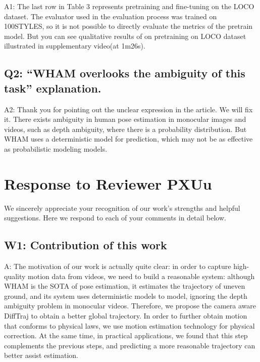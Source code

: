 \documentclass{article}
\begin{document}
A1: The last row in Table 3 represents pretraining and fine-tuning on the LOCO dataset. The evaluator used in the evaluation process was trained on 100STYLES, so it is not possible to directly evaluate the metrics of the pretrain model. But you can see qualitative results of on pretraining on LOCO dataset illustrated in supplementary video(at 1m26s).

\subsection{Q2: ``WHAM overlooks the ambiguity of this task'' explanation.}\label{q2-wham-overlooks-the-ambiguity-of-this-task-explanation.}

A2: Thank you for pointing out the unclear expression in the article. We will fix it. There exists ambiguity in human pose estimation in monocular images and videos, such as depth ambiguity, where there is a probability distribution. But WHAM uses a deterministic model for prediction, which may not be as effective as probabilistic modeling models.

\section{Response to Reviewer PXUu}\label{response-to-reviewer-pxuu}

We sincerely appreciate your recognition of our work's strengths and helpful suggestions. Here we respond to each of your comments in detail below.

\subsection{W1: Contribution of this work}\label{w1-contribution-of-this-work}

A: The motivation of our work is actually quite clear: in order to capture high-quality motion data from videos, we need to build a reasonable system: although WHAM is the SOTA of pose estimation, it estimates the trajectory of uneven ground, and its system uses deterministic models to model, ignoring the depth ambiguity problem in monocular videos. Therefore, we propose the camera aware DiffTraj to obtain a better global trajectory. In order to further obtain motion that conforms to physical laws, we use motion estimation technology for physical correction. At the same time, in practical applications, we found that this step complements the previous steps, and predicting a more reasonable trajectory can better assist estimation.
\end{document}
